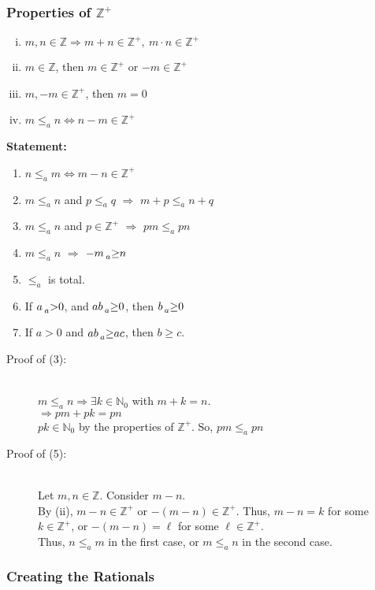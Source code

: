 \documentclass[10pt]{extarticle}
\newcommand{\N}{\mathbb{N}}
\newcommand{\Z}{\mathbb{Z}}
\begin{document}
    \subsubsection{Properties of $\Z^+$}%
    \begin{enumerate}[(i)]
      \item $m,n\in \Z\Rightarrow m+n\in\Z^+,~m\cdot n\in \Z^+$
      \item $m\in \Z$, then $m\in \Z^+$ or $-m\in\Z^+$
      \item $m,-m\in \Z^+$, then $m=0$
      \item $m\leq_a n \Leftrightarrow n-m\in\Z^+$
    \end{enumerate}
    \textbf{Statement:}
      \begin{enumerate}[(\arabic*)]
        \item $n\leq_a m\Leftrightarrow m-n\in\Z^+$
        \item $m\leq_a n$ and $p\leq_a q$ $\Rightarrow$ $m+p \leq_a n+q$
        \item $m\leq_a n$ and $p\in \Z^+$ $\Rightarrow$ $pm\leq_a pn$
        \item $m\leq_a n$ $\Rightarrow$ $-m \prescript{}{a}\geq n$
        \item $\leq_a$ is total.
        \item If $a \prescript{}{a}>0$, and $ab \prescript{}{a}\geq 0$, then $b\prescript{}{a}\geq 0$
        \item If $a > 0$ and $ab \prescript{}{a}\geq ac$, then $b\geq c$.
      \end{enumerate}
      \begin{description}
        \item[Proof of (3):]\hfill\\
          $m\leq_a n \Rightarrow \exists k\in \N_0$ with $m+k = n$.\\
          $\Rightarrow pm + pk = pn$\\
          $pk\in \N_0$ by the properties of $\Z^+$. So, $pm \leq_a pn$
        \item[Proof of (5):]\hfill\\
          Let $m,n\in\Z$. Consider $m-n$.\\
          By (ii), $m-n\in\Z^+$ or $-(m-n)\in\Z^+$. Thus, $m-n = k$ for some $k\in\Z^+$, or $-(m-n) = \ell$ for some $\ell\in\Z^+$.\\
          Thus, $n\leq_a m$ in the first case, or $m\leq_a n$ in the second case.
      \end{description}
    \subsubsection{Creating the Rationals}%
    
\end{document}
